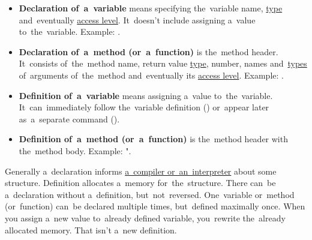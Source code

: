 \label{declarationdefinition}
\begin{itemize}
    \item \textbf{Declaration of~a~variable} means specifying the~variable name, \hyperref[datatypes]{type} and~eventually \hyperref[javaaccessmodifiers]{access level}.
          It~doesn't include assigning a~value to~the~variable.
          Example: .
    \item \textbf{Declaration of~a~method (or~a~function)} is the~method header.
          It~consists of~the~method name, return value \hyperref[datatypes]{type}, number, names and~\hyperref[datatypes]{types} of~arguments of~the~method and~eventually its \hyperref[javaaccessmodifiers]{access level}.
          Example: .
    \item \textbf{Definition of~a~variable} means assigning a~value to~the~variable.
          It~can~immediately follow the~variable definition () or~appear later as~a~separate command ().
    \item \textbf{Definition of~a~method (or~a~function)} is the~method header with the~method body.
          Example: ".
\end{itemize}
\newpage

\noindent Generally a~declaration informs \hyperref[compiledinterpretedlanguages]{a~compiler or~an~interpreter} about some structure.
Definition allocates a~memory for~the~structure.
There can~be a~declaration without a~definition, but~not~reversed.
One~variable or~method (or~function) can~be declared multiple times, but~defined maximally once.
When you assign a~new value to~already defined variable, you~rewrite the~already allocated memory.
That isn't a~new definition.

